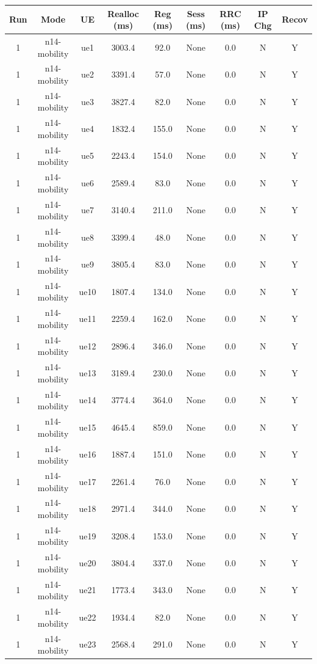 \begin{table}[ht]
\centering
\begin{tabular}{|c|c|c|c|c|c|c|c|c|}
\hline
Run & Mode & UE & Realloc (ms) & Reg (ms) & Sess (ms) & RRC (ms) & IP Chg & Recov \\
\hline
1 & n14-mobility & ue1 & 3003.4 & 92.0 & None & 0.0 & N & Y \\
1 & n14-mobility & ue2 & 3391.4 & 57.0 & None & 0.0 & N & Y \\
1 & n14-mobility & ue3 & 3827.4 & 82.0 & None & 0.0 & N & Y \\
1 & n14-mobility & ue4 & 1832.4 & 155.0 & None & 0.0 & N & Y \\
1 & n14-mobility & ue5 & 2243.4 & 154.0 & None & 0.0 & N & Y \\
1 & n14-mobility & ue6 & 2589.4 & 83.0 & None & 0.0 & N & Y \\
1 & n14-mobility & ue7 & 3140.4 & 211.0 & None & 0.0 & N & Y \\
1 & n14-mobility & ue8 & 3399.4 & 48.0 & None & 0.0 & N & Y \\
1 & n14-mobility & ue9 & 3805.4 & 83.0 & None & 0.0 & N & Y \\
1 & n14-mobility & ue10 & 1807.4 & 134.0 & None & 0.0 & N & Y \\
1 & n14-mobility & ue11 & 2259.4 & 162.0 & None & 0.0 & N & Y \\
1 & n14-mobility & ue12 & 2896.4 & 346.0 & None & 0.0 & N & Y \\
1 & n14-mobility & ue13 & 3189.4 & 230.0 & None & 0.0 & N & Y \\
1 & n14-mobility & ue14 & 3774.4 & 364.0 & None & 0.0 & N & Y \\
1 & n14-mobility & ue15 & 4645.4 & 859.0 & None & 0.0 & N & Y \\
1 & n14-mobility & ue16 & 1887.4 & 151.0 & None & 0.0 & N & Y \\
1 & n14-mobility & ue17 & 2261.4 & 76.0 & None & 0.0 & N & Y \\
1 & n14-mobility & ue18 & 2971.4 & 344.0 & None & 0.0 & N & Y \\
1 & n14-mobility & ue19 & 3208.4 & 153.0 & None & 0.0 & N & Y \\
1 & n14-mobility & ue20 & 3804.4 & 337.0 & None & 0.0 & N & Y \\
1 & n14-mobility & ue21 & 1773.4 & 343.0 & None & 0.0 & N & Y \\
1 & n14-mobility & ue22 & 1934.4 & 82.0 & None & 0.0 & N & Y \\
1 & n14-mobility & ue23 & 2568.4 & 291.0 & None & 0.0 & N & Y \\

\end{tabular}
\end{table}
